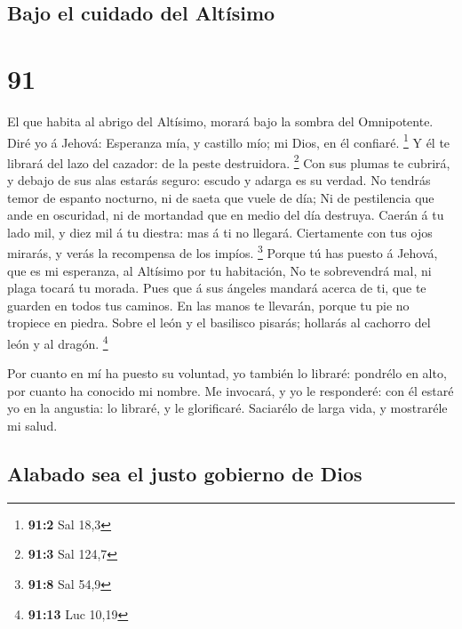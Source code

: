 \hypertarget{bajo-el-cuidado-del-altuxedsimo}{%
\subsection{Bajo el cuidado del
Altísimo}\label{bajo-el-cuidado-del-altuxedsimo}}

\hypertarget{section-90}{%
\section{91}\label{section-90}}

 El que habita al abrigo del Altísimo, morará bajo la sombra
del Omnipotente.  Diré yo á Jehová: Esperanza mía, y
castillo mío; mi Dios, en él confiaré. \footnote{\textbf{91:2} Sal 18,3}
 Y él te librará del lazo del cazador: de la peste
destruidora. \footnote{\textbf{91:3} Sal 124,7}  Con sus
plumas te cubrirá, y debajo de sus alas estarás seguro: escudo y adarga
es su verdad.  No tendrás temor de espanto nocturno, ni de
saeta que vuele de día;  Ni de pestilencia que ande en
oscuridad, ni de mortandad que en medio del día destruya. 
Caerán á tu lado mil, y diez mil á tu diestra: mas á ti no llegará.
 Ciertamente con tus ojos mirarás, y verás la recompensa de
los impíos. \footnote{\textbf{91:8} Sal 54,9}  Porque tú has
puesto á Jehová, que es mi esperanza, al Altísimo por tu habitación,
 No te sobrevendrá mal, ni plaga tocará tu morada.
 Pues que á sus ángeles mandará acerca de ti, que te
guarden en todos tus caminos.  En las manos te llevarán,
porque tu pie no tropiece en piedra.  Sobre el león y el
basilisco pisarás; hollarás al cachorro del león y al dragón.
\footnote{\textbf{91:13} Luc 10,19}

 Por cuanto en mí ha puesto su voluntad, yo también lo
libraré: pondrélo en alto, por cuanto ha conocido mi nombre.
 Me invocará, y yo le responderé: con él estaré yo en la
angustia: lo libraré, y le glorificaré.  Saciarélo de larga
vida, y mostraréle mi salud.

\hypertarget{alabado-sea-el-justo-gobierno-de-dios}{%
\subsection{Alabado sea el justo gobierno de
Dios}\label{alabado-sea-el-justo-gobierno-de-dios}}

